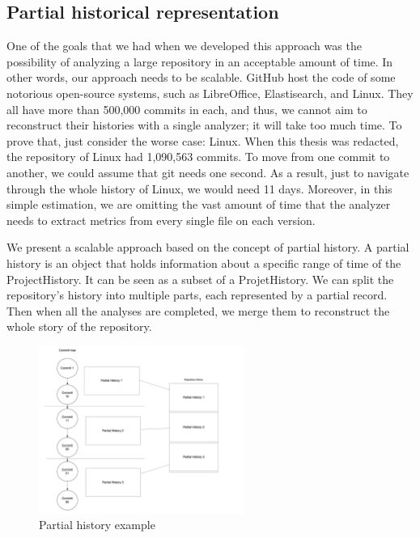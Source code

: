 \label{s:partialHistoricalRepr}
\subsection*{Partial historical representation}
One of the goals that we had when we developed this approach was the possibility of analyzing a large repository in an acceptable amount of time. 
In other words, our approach needs to be scalable.
GitHub host the code of some notorious open-source systems, such as LibreOffice, Elastisearch, and Linux.
They all have more than 500,000 commits in each, and thus, we cannot aim to reconstruct their histories with a single analyzer; it will take too much time.  
To prove that, just consider the worse case: Linux. 
When this thesis was redacted, the repository of Linux had 1,090,563 commits. 
To move from one commit to another, we could assume that git needs one second. 
As a result, just to navigate through the whole history of Linux, we would need 11 days.
Moreover, in this simple estimation, we are omitting the vast amount of time that the analyzer needs to extract metrics from every single file on each version. 

We present a scalable approach based on the concept of partial history.
A partial history is an object that holds information about a specific range of time of the ProjectHistory. 
It can be seen as a subset of a ProjetHistory. 
We can split the repository's history into multiple parts, each represented by a partial record. Then when all the analyses are completed, we merge them to reconstruct the whole story of the repository.


\begin{figure}
    \begin{center}
        \includegraphics[width=0.6\textwidth]{PartialHistory.png}
    \end{center}
    \caption{Partial history example}
    \label{fig:PartialHistory}
\end{figure}

